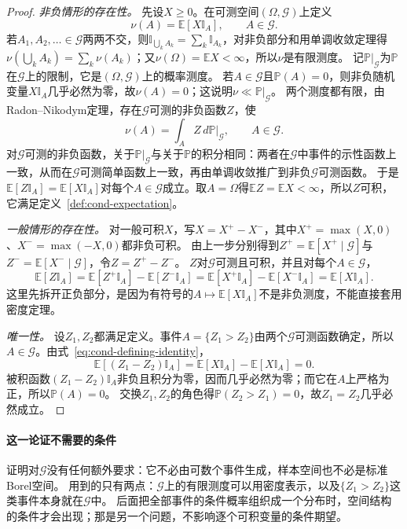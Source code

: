 \begin{proof}
\emph{非负情形的存在性。}
先设$X\geq0$。在可测空间$(\Omega,\mathcal G)$上定义
\[
  \nu(A)=\mathbb E[X\mathbb I_A],\qquad A\in\mathcal G.
\]
若$A_1,A_2,\ldots\in\mathcal G$两两不交，则$\mathbb I_{\bigcup_kA_k}=\sum_k\mathbb I_{A_k}$，对非负部分和用单调收敛定理得$\nu(\bigcup_kA_k)=\sum_k\nu(A_k)$；又$\nu(\Omega)=\mathbb EX<\infty$，所以$\nu$是有限测度。
记$\mathbb P|_{\mathcal G}$为$\mathbb P$在$\mathcal G$上的限制，它是$(\Omega,\mathcal G)$上的概率测度。
若$A\in\mathcal G$且$\mathbb P(A)=0$，则非负随机变量$X\mathbb I_A$几乎必然为零，故$\nu(A)=0$；这说明$\nu\ll\mathbb P|_{\mathcal G}$。
两个测度都有限，由Radon--Nikodym定理，存在$\mathcal G$可测的非负函数$Z$，使
\[
  \nu(A)=\int_AZ\,d\mathbb P|_{\mathcal G},\qquad A\in\mathcal G.
\]
对$\mathcal G$可测的非负函数，关于$\mathbb P|_{\mathcal G}$与关于$\mathbb P$的积分相同：两者在$\mathcal G$中事件的示性函数上一致，从而在$\mathcal G$可测简单函数上一致，再由单调收敛推广到非负$\mathcal G$可测函数。
于是$\mathbb E[Z\mathbb I_A]=\mathbb E[X\mathbb I_A]$对每个$A\in\mathcal G$成立。取$A=\Omega$得$\mathbb EZ=\mathbb EX<\infty$，所以$Z$可积，它满足定义~\ref{def:cond-expectation}。

\emph{一般情形的存在性。}
对一般可积$X$，写$X=X^+-X^-$，其中$X^+=\max(X,0)$、$X^-=\max(-X,0)$都非负可积。
由上一步分别得到$Z^+=\mathbb E[X^+\mid\mathcal G]$与$Z^-=\mathbb E[X^-\mid\mathcal G]$，令$Z=Z^+-Z^-$。
$Z$对$\mathcal G$可测且可积，并且对每个$A\in\mathcal G$，
\[
  \mathbb E[Z\mathbb I_A]=\mathbb E[Z^+\mathbb I_A]-\mathbb E[Z^-\mathbb I_A]=\mathbb E[X^+\mathbb I_A]-\mathbb E[X^-\mathbb I_A]=\mathbb E[X\mathbb I_A].
\]
这里先拆开正负部分，是因为有符号的$A\mapsto\mathbb E[X\mathbb I_A]$不是非负测度，不能直接套用密度定理。

\emph{唯一性。}
设$Z_1,Z_2$都满足定义。事件$A=\{Z_1>Z_2\}$由两个$\mathcal G$可测函数确定，所以$A\in\mathcal G$。由式~\eqref{eq:cond-defining-identity}，
\[
  \mathbb E[(Z_1-Z_2)\mathbb I_A]=\mathbb E[X\mathbb I_A]-\mathbb E[X\mathbb I_A]=0.
\]
被积函数$(Z_1-Z_2)\mathbb I_A$非负且积分为零，因而几乎必然为零；而它在$A$上严格为正，所以$\mathbb P(A)=0$。
交换$Z_1,Z_2$的角色得$\mathbb P(Z_2>Z_1)=0$，故$Z_1=Z_2$几乎必然成立。
\end{proof}

\paragraph{这一论证不需要的条件}
证明对$\mathcal G$没有任何额外要求：它不必由可数个事件生成，样本空间也不必是标准Borel空间。
用到的只有两点：$\mathcal G$上的有限测度可以用密度表示，以及$\{Z_1>Z_2\}$这类事件本身就在$\mathcal G$中。
后面把全部事件的条件概率组织成一个分布时，空间结构的条件才会出现；那是另一个问题，不影响逐个可积变量的条件期望。

